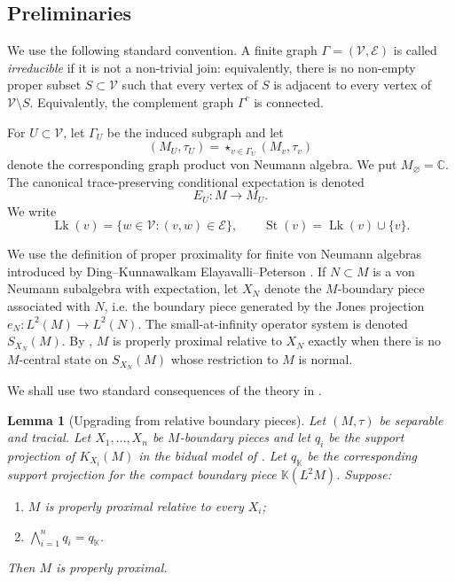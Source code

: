 \documentclass[12pt]{article}
\newtheorem{lemma}[theorem]{Lemma}
\theoremstyle{definition}
\newcommand{\V}{\mathcal V}
\newcommand{\E}{\mathcal E}
\newcommand{\Lk}{\operatorname{Lk}}
\newcommand{\St}{\operatorname{St}}
\newcommand{\K}{\mathbb K}
\newcommand{\C}{\mathbb C}
\begin{document}
\date{}




\begin{abstract}
We prove that if $\Gamma$ is a finite join-irreducible simplicial graph with at least three vertices and if each tracial vertex algebra $(M_v,\tau_v)$ contains a trace-zero unitary, then the tracial graph product von Neumann algebra is properly proximal.
\end{abstract}

\subsection{Preliminaries}

We use the following standard convention.  A finite graph $\Gamma=(\V,\E)$ is called \emph{irreducible} if it is not a non-trivial join: equivalently, there is no non-empty proper subset $S\subset \V$ such that every vertex of $S$ is adjacent to every vertex of $\V\setminus S$.  Equivalently, the complement graph $\Gamma^c$ is connected.

For $U\subset \V$, let $\Gamma_U$ be the induced subgraph and let
\[
(M_U,\tau_U)=\mathop{\star}_{v\in \Gamma_U}(M_v,\tau_v)
\]
denote the corresponding graph product von Neumann algebra.  We put $M_\varnothing=\C$.  The canonical trace-preserving conditional expectation is denoted
\[
E_U:M\to M_U.
\]
We write
\[
\Lk(v)=\{w\in \V: (v,w)\in \E\},
\qquad
\St(v)=\Lk(v)\cup\{v\}.
\]

We use the definition of proper proximality for finite von Neumann algebras introduced by Ding--Kunnawalkam Elayavalli--Peterson \cite{DKEP}.  If $N\subset M$ is a von Neumann subalgebra with expectation, let $X_N$ denote the $M$-boundary piece associated with $N$, i.e. the boundary piece generated by the Jones projection $e_N:L^2(M)\to L^2(N)$.  The small-at-infinity operator system is denoted $S_{X_N}(M)$.  By \cite[Theorems 6.2 and 8.5]{DKEP}, $M$ is properly proximal relative to $X_N$ exactly when there is no $M$-central state on $S_{X_N}(M)$ whose restriction to $M$ is normal.

We shall use two standard consequences of the theory in \cite{DKEP}.

\begin{lemma}[Upgrading from relative boundary pieces]\label{lem:upgrade}
Let $(M,\tau)$ be separable and tracial.  Let $X_1,\dots,X_n$ be $M$-boundary pieces and let $q_i$ be the support projection of $K_{X_i}(M)$ in the bidual model of \cite[Section 8]{DKEP}.  Let $q_{\K}$ be the corresponding support projection for the compact boundary piece $\K(L^2M)$.  Suppose:
\begin{enumerate}[label=(\roman*)]
\item $M$ is properly proximal relative to every $X_i$;
\item $\bigwedge_{i=1}^n q_i=q_{\K}$.
\end{enumerate}
Then $M$ is properly proximal.
\end{lemma}
\end{document}
